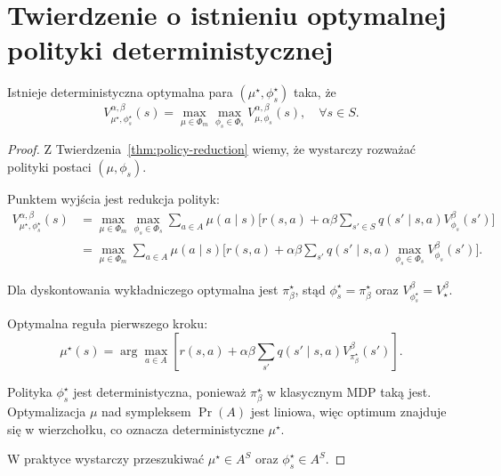 \section{Twierdzenie o istnieniu optymalnej polityki deterministycznej}

\begin{theorem}
\label{thm:deterministic-optimal}
Istnieje deterministyczna optymalna para $(\mu^\star, \phi_s^\star)$ taka, że
\begin{equation}
V^{\alpha, \beta}_{\mu^\star, \phi_s^\star}(s) = \max_{\mu \in \Phi_m} \max_{\phi_s \in \Phi_s} V^{\alpha, \beta}_{\mu, \phi_s}(s), \quad \forall s \in S.
\end{equation}
\end{theorem}

\begin{proof}
Z Twierdzenia~\ref{thm:policy-reduction} wiemy, że wystarczy rozważać polityki postaci $(\mu, \phi_s)$.

Punktem wyjścia jest redukcja polityk:
\begin{align}
V^{\alpha, \beta}_{\mu^\star, \phi_s^\star}(s) &= \max_{\mu \in \Phi_m} \max_{\phi_s \in \Phi_s} \sum_{a \in A} \mu(a\mid s) \Big[ r(s, a) + \alpha \beta \sum_{s' \in S} q(s'\mid s, a) V^{\beta}_{\phi_s}(s') \Big] \nonumber \\
&= \max_{\mu \in \Phi_m} \sum_{a \in A} \mu(a\mid s) \Big[ r(s, a) + \alpha \beta \sum_{s'} q(s'\mid s, a) \max_{\phi_s \in \Phi_s} V^{\beta}_{\phi_s}(s') \Big].
\end{align}

Dla dyskontowania wykładniczego optymalna jest $\pi_\beta^\star$, stąd $\phi_s^\star = \pi_\beta^\star$ oraz $V^{\beta}_{\phi_s^\star} = V^{\beta}_\star$.

Optymalna reguła pierwszego kroku:
\begin{equation}
\mu^\star(s) = \arg\max_{a \in A} \left[ r(s, a) + \alpha \beta \sum_{s'} q(s'\mid s, a) V^{\beta}_{\pi^\star_\beta}(s') \right].
\end{equation}

Polityka $\phi_s^\star$ jest deterministyczna, ponieważ $\pi_\beta^\star$ w klasycznym MDP taką jest. Optymalizacja $\mu$ nad sympleksem $\Pr(A)$ jest liniowa, więc optimum znajduje się w wierzchołku, co oznacza deterministyczne $\mu^\star$.

W praktyce wystarczy przeszukiwać $\mu^\star \in A^S$ oraz $\phi_s^\star \in A^S$.
\end{proof}

